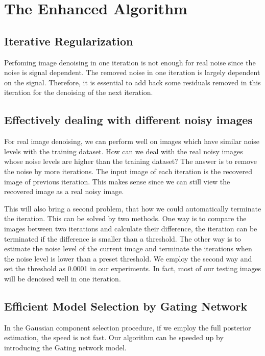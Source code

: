 \documentclass[10pt,twocolumn,letterpaper]{article}
\begin{document}
\section{The Enhanced Algorithm}

\subsection{Iterative Regularization}
Perfoming image denoising in one iteration is not enough for real noise since the noise is signal dependent. The removed noise in one iteration is largely dependent on the signal. Therefore, it is essential to add back some residuals removed in this iteration for the denoising of the next iteration. 

\subsection{Effectively dealing with different noisy images}
For real image denoising, we can perform well on images which have similar noise levels with the training dataset. How can we deal with the real noisy images whose noise levels are higher than the training dataset? The answer is to remove the noise by more iterations. The input image of each iteration is the recovered image of previous iteration. This makes sense since we can still view the recovered image as a real noisy image. 

This will also bring a second problem, that how we could automatically terminate the iteration. This can be solved by two methods. One way is to compare the images between two iterations and calculate their difference, the iteration can be terminated if the difference is smaller than a threshold. The other way is to estimate the noise level of the current image and terminate the iterations when the noise level is lower than a preset threshold. We employ the second way and set the threshold as 0.0001 in our experiments. In fact, most of our testing images will be denoised well in one iteration.

\subsection{Efficient Model Selection by Gating Network}
In the Gaussian component selection procedure, if we employ the full posterior estimation, the speed is not fast. Our algorithm can be speeded up by introducing the Gating network model.
\end{document}
